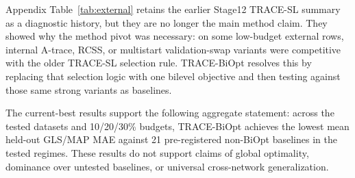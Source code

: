 Appendix Table~\ref{tab:external} retains the earlier Stage12 TRACE-SL summary
as a diagnostic history, but
they are no longer the main method claim. They showed why the method pivot was
necessary: on some low-budget external rows, internal A-trace, RCSS, or
multistart validation-swap variants were competitive with the older
TRACE-SL selection rule. TRACE-BiOpt resolves this by replacing that
selection logic with
one bilevel objective and then testing against those same strong variants as
baselines.

The current-best results support the following aggregate statement: across
the tested datasets and 10/20/30\% budgets, TRACE-BiOpt achieves the lowest
mean held-out GLS/MAP MAE against 21 pre-registered non-BiOpt baselines in the
tested regimes. These results do not support claims of global optimality,
dominance over untested baselines, or universal cross-network generalization.
